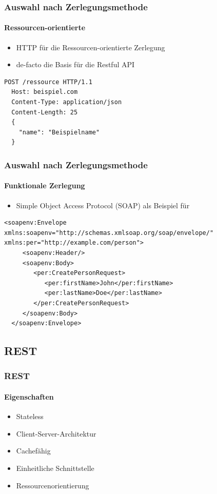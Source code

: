 \begin{frame} [fragile]
  \frametitle{Auswahl nach Zerlegungsmethode}
  \framesubtitle{Ressourcen-orientierte}
  \begin{itemize}
    \item HTTP für die Ressourcen-orientierte Zerlegung
    \item de-facto die Basis für die Restful API
  \end{itemize}
  \begin{minipage}{\textwidth}
  \begin{lstlisting}[caption={Ressource anlegen (POST)},captionpos=b,label={lst:post}]
  POST /ressource HTTP/1.1
  Host: beispiel.com
  Content-Type: application/json
  Content-Length: 25
  {
    "name": "Beispielname"
  }
  \end{lstlisting}
  \end{minipage}
\end{frame}


\begin{frame} [fragile]
  \frametitle{Auswahl nach Zerlegungsmethode}
  \framesubtitle{Funktionale Zerlegung}
  \begin{itemize}
    \item Simple Object Access Protocol (SOAP) als Beispiel für 
  \end{itemize}
  \begin{minipage}{\textwidth}
  \begin{lstlisting}[caption={SOAP create},captionpos=b,label={lst:s_create}]
  <soapenv:Envelope xmlns:soapenv="http://schemas.xmlsoap.org/soap/envelope/" xmlns:per="http://example.com/person">
     <soapenv:Header/>
     <soapenv:Body>
        <per:CreatePersonRequest>
           <per:firstName>John</per:firstName>
           <per:lastName>Doe</per:lastName>
        </per:CreatePersonRequest>
     </soapenv:Body>
  </soapenv:Envelope>
  \end{lstlisting}
  \end{minipage}
\end{frame}

\subsection{REST}
\begin{frame}
  \frametitle{REST}
  \framesubtitle{Eigenschaften}
  \begin{itemize}
    \item Stateless
    \item Client-Server-Architektur
    \item Cachefähig
    \item Einheitliche Schnittstelle
    \item Ressourcenorientierung
  \end{itemize}
\end{frame}

